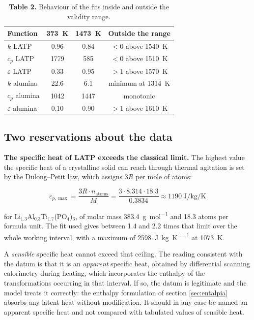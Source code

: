 \documentclass[11pt,a4paper]{article}
\begin{document}
\begin{table}[htbp]
\centering
\caption*{\textcolor{uji}{\textbf{Table 2.}} Behaviour of the fits inside
and outside the validity range.}
\begin{tabular}{lccc}
\toprule
Function & \SI{373}{\kelvin} & \SI{1473}{\kelvin} & Outside the range \\
\midrule
$k$ LATP & \num{0.96} & \num{0.84} & $<0$ above \SI{1540}{\kelvin} \\
$c_p$ LATP & \num{1779} & \num{585} & $<0$ above \SI{1510}{\kelvin} \\
$\varepsilon$ LATP & \num{0.33} & \num{0.95} & $>1$ above \SI{1570}{\kelvin} \\
$k$ alumina & \num{22.6} & \num{6.1} & minimum at \SI{1314}{\kelvin} \\
$c_p$ alumina & \num{1042} & \num{1447} & monotonic \\
$\varepsilon$ alumina & \num{0.10} & \num{0.90} & $>1$ above \SI{1610}{\kelvin} \\
\bottomrule
\end{tabular}
\end{table}

\subsection{Two reservations about the data}
\label{sec:reservas}

\textbf{The specific heat of LATP exceeds the classical limit.} The highest
value the specific heat of a crystalline solid can reach through thermal
agitation is set by the Dulong--Petit law, which assigns $3R$ per mole of
atoms:

\begin{equation}
c_{p,\max} = \frac{3R \cdot n_{\text{atoms}}}{M}
= \frac{3 \cdot 8.314 \cdot 18.3}{0.3834}
\approx \SI{1190}{\joule\per\kilogram\per\kelvin}
\end{equation}

for Li$_{1.3}$Al$_{0.3}$Ti$_{1.7}$(PO$_4$)$_3$, of molar mass
\SI{383.4}{\gram\per\mole} and \num{18.3} atoms per formula unit. The fit
used gives between \num{1.4} and \num{2.2} times that limit over the whole
working interval, with a maximum of
\SI{2598}{\joule\per\kilogram\per\kelvin} at \SI{1073}{\kelvin}.

A \emph{sensible} specific heat cannot exceed that ceiling. The reading
consistent with the datum is that it is an \emph{apparent} specific heat,
obtained by differential scanning calorimetry during heating, which
incorporates the enthalpy of the transformations occurring in that
interval. If so, the datum is legitimate and the model treats it correctly:
the enthalpy formulation of section \ref{sec:entalpia} absorbs any latent
heat without modification. It should in any case be named an apparent
specific heat and not compared with tabulated values of sensible heat.
\end{document}
